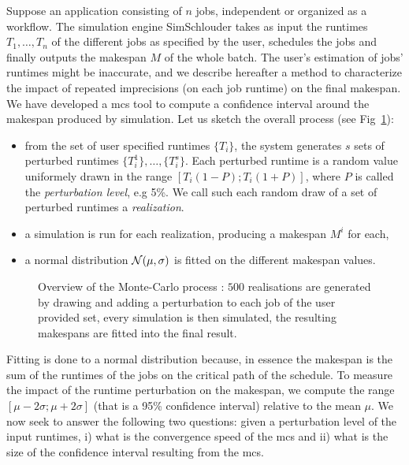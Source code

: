 \documentclass[10pt,conference,compsocconf]{IEEEtran}
\begin{document}
Suppose an  application consisting of  $n$ jobs,  independent or organized  as a
workflow.   The  simulation engine  SimSchlouder  takes  as input  the  runtimes
$T_1, \ldots ,  T_n$ of the different  jobs as specified by  the user, schedules
the jobs and  finally outputs the makespan  $M$ of the whole  batch.  The user's
estimation of  jobs' runtimes might be  inaccurate, and we describe  hereafter a
method to characterize the impact of repeated imprecisions (on each job runtime)
on the  final makespan.  We  have developed a \ac{mcs}  tool to compute a
confidence interval around the makespan produced   by   simulation.   Let   us
sketch   the   overall   process   (see Fig~\ref{fig:mc-process}):
\begin{itemize} 
\item from  the set of user  specified runtimes $\{T_i\}$, the  system generates
  $s$ sets of perturbed runtimes  $\{T_i^1\}, \ldots, \{T_i^s\}$. Each perturbed
  runtime    is   a    random   value    uniformely   drawn    in   the    range
  $[T_i (1-P); T_i  (1+P)]$, where $P$ is called  the \emph{perturbation level},
  e.g  5\%. We  call such  each random  draw of  a set  of perturbed  runtimes a
  \emph{realization}.
\item a simulation  is run for each realization, producing  a makespan $M^i$ for
  each,
\item  a  normal  distribution  ${\cal N}(\mu,\sigma)$  is  fitted  on
		the different  makespan values.
\end{itemize}
\begin{figure}
	\centering
	\resizebox{0.5\textwidth}{!}{%
		
		}
	\caption{Overview of the Monte-Carlo process : $500$ realisations are
	generated by drawing and adding a perturbation to each job of the
	user provided set, every simulation is then simulated, the resulting
	makespans are fitted into the final result. \label{fig:mcprocess}}
      \label{fig:mc-process}
\end{figure}
Fitting is done to a normal distribution because, in essence the makespan is the
sum  of the  runtimes of  the jobs  on the  critical path  of the  schedule.  To
measure the impact  of the runtime perturbation on the  makespan, we compute the
range $[\mu-2\sigma;\mu+2\sigma]$ (that is  a 95\% confidence interval) relative
to  the mean  $\mu$. 
We now  seek to answer the  following two questions: given  a perturbation
  level  of  the input  runtimes,  i)  what is  the  convergence  speed of  the
\ac{mcs} and  ii) what  is the  size of  the confidence  interval
resulting from the \ac{mcs}.
\end{document}
